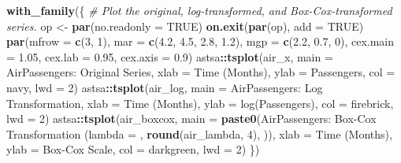 \documentclass[
  10pt,
]{extarticle}
\newenvironment{Shaded}{\begin{snugshade}}{\end{snugshade}}
\newcommand{\AttributeTok}[1]{\textcolor[rgb]{0.13,0.29,0.53}{#1}}
\newcommand{\CommentTok}[1]{\textcolor[rgb]{0.56,0.35,0.01}{\textit{#1}}}
\newcommand{\ConstantTok}[1]{\textcolor[rgb]{0.56,0.35,0.01}{#1}}
\newcommand{\DecValTok}[1]{\textcolor[rgb]{0.00,0.00,0.81}{#1}}
\newcommand{\FloatTok}[1]{\textcolor[rgb]{0.00,0.00,0.81}{#1}}
\newcommand{\FunctionTok}[1]{\textcolor[rgb]{0.13,0.29,0.53}{\textbf{#1}}}
\newcommand{\NormalTok}[1]{#1}
\newcommand{\OtherTok}[1]{\textcolor[rgb]{0.56,0.35,0.01}{#1}}
\newcommand{\SpecialCharTok}[1]{\textcolor[rgb]{0.81,0.36,0.00}{\textbf{#1}}}
\newcommand{\StringTok}[1]{\textcolor[rgb]{0.31,0.60,0.02}{#1}}
\begin{document}
\begin{Shaded}
\begin{Highlighting}[]
\FunctionTok{with\_family}\NormalTok{(\{}
  \CommentTok{\# Plot the original, log{-}transformed, and Box{-}Cox{-}transformed series.}
\NormalTok{  op }\OtherTok{\textless{}{-}} \FunctionTok{par}\NormalTok{(}\AttributeTok{no.readonly =} \ConstantTok{TRUE}\NormalTok{)}
  \FunctionTok{on.exit}\NormalTok{(}\FunctionTok{par}\NormalTok{(op), }\AttributeTok{add =} \ConstantTok{TRUE}\NormalTok{)}
  \FunctionTok{par}\NormalTok{(}\AttributeTok{mfrow =} \FunctionTok{c}\NormalTok{(}\DecValTok{3}\NormalTok{, }\DecValTok{1}\NormalTok{), }\AttributeTok{mar =} \FunctionTok{c}\NormalTok{(}\FloatTok{4.2}\NormalTok{, }\FloatTok{4.5}\NormalTok{, }\FloatTok{2.8}\NormalTok{, }\FloatTok{1.2}\NormalTok{), }\AttributeTok{mgp =} \FunctionTok{c}\NormalTok{(}\FloatTok{2.2}\NormalTok{, }\FloatTok{0.7}\NormalTok{, }\DecValTok{0}\NormalTok{), }\AttributeTok{cex.main =} \FloatTok{1.05}\NormalTok{, }\AttributeTok{cex.lab =} \FloatTok{0.95}\NormalTok{, }\AttributeTok{cex.axis =} \FloatTok{0.9}\NormalTok{)}
\NormalTok{  astsa}\SpecialCharTok{::}\FunctionTok{tsplot}\NormalTok{(air\_x, }\AttributeTok{main =} \StringTok{\textquotesingle{}AirPassengers: Original Series\textquotesingle{}}\NormalTok{, }\AttributeTok{xlab =} \StringTok{\textquotesingle{}Time (Months)\textquotesingle{}}\NormalTok{, }\AttributeTok{ylab =} \StringTok{\textquotesingle{}Passengers\textquotesingle{}}\NormalTok{, }\AttributeTok{col =} \StringTok{\textquotesingle{}navy\textquotesingle{}}\NormalTok{, }\AttributeTok{lwd =} \DecValTok{2}\NormalTok{)}
\NormalTok{  astsa}\SpecialCharTok{::}\FunctionTok{tsplot}\NormalTok{(air\_log, }\AttributeTok{main =} \StringTok{\textquotesingle{}AirPassengers: Log Transformation\textquotesingle{}}\NormalTok{, }\AttributeTok{xlab =} \StringTok{\textquotesingle{}Time (Months)\textquotesingle{}}\NormalTok{, }\AttributeTok{ylab =} \StringTok{\textquotesingle{}log(Passengers)\textquotesingle{}}\NormalTok{, }\AttributeTok{col =} \StringTok{\textquotesingle{}firebrick\textquotesingle{}}\NormalTok{, }\AttributeTok{lwd =} \DecValTok{2}\NormalTok{)}
\NormalTok{  astsa}\SpecialCharTok{::}\FunctionTok{tsplot}\NormalTok{(air\_boxcox, }\AttributeTok{main =} \FunctionTok{paste0}\NormalTok{(}\StringTok{\textquotesingle{}AirPassengers: Box{-}Cox Transformation (lambda = \textquotesingle{}}\NormalTok{, }\FunctionTok{round}\NormalTok{(air\_lambda, }\DecValTok{4}\NormalTok{), }\StringTok{\textquotesingle{})\textquotesingle{}}\NormalTok{), }\AttributeTok{xlab =} \StringTok{\textquotesingle{}Time (Months)\textquotesingle{}}\NormalTok{, }\AttributeTok{ylab =} \StringTok{\textquotesingle{}Box{-}Cox Scale\textquotesingle{}}\NormalTok{, }\AttributeTok{col =} \StringTok{\textquotesingle{}darkgreen\textquotesingle{}}\NormalTok{, }\AttributeTok{lwd =} \DecValTok{2}\NormalTok{)}
\NormalTok{\})}
\end{Highlighting}
\end{Shaded}
\end{document}
